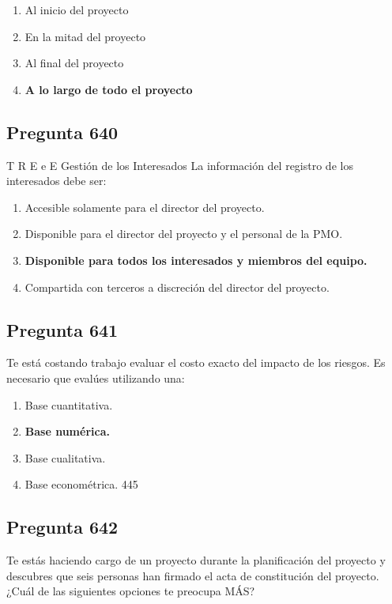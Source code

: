 \documentclass[11pt,a4paper]{article}
\begin{document}
\begin{enumerate}[label=\alph*)]
  \item Al inicio del proyecto
  \item En la mitad del proyecto
  \item Al final del proyecto
  \item \textbf{A lo largo de todo el proyecto}
\end{enumerate}

\subsection*{Pregunta 640}
T R E e E Gestión de los Interesados La información del registro de los interesados debe ser:

\begin{enumerate}[label=\alph*)]
  \item Accesible solamente para el director del proyecto.
  \item Disponible para el director del proyecto y el personal de la PMO.
  \item \textbf{Disponible para todos los interesados y miembros del equipo.}
  \item Compartida con terceros a discreción del director del proyecto.
\end{enumerate}

\subsection*{Pregunta 641}
Te está costando trabajo evaluar el costo exacto del impacto de los riesgos. Es necesario que evalúes utilizando una:

\begin{enumerate}[label=\alph*)]
  \item Base cuantitativa.
  \item \textbf{Base numérica.}
  \item Base cualitativa.
  \item Base econométrica. 445
\end{enumerate}

\subsection*{Pregunta 642}
Te estás haciendo cargo de un proyecto durante la planificación del proyecto y descubres que seis personas han firmado el acta de constitución del proyecto. ¿Cuál de las siguientes opciones te preocupa MÁS?
\end{document}
